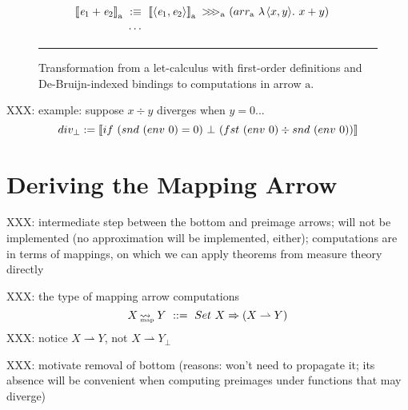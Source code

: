 \documentclass[preprint]{sigplanconf}
\newcommand{\arrow}{\rightsquigarrow}
\newcommand{\pto}{\rightharpoonup}
\newcommand{\arrowarr}{\ensuremath{arr}}
\newcommand{\arrowcomp}{\ensuremath{{>}\mspace{-6mu}{>}\mspace{-6mu}{>}}}
\newcommand{\map}{_\mathrm{map}}
\DeclareMathOperator{\mapto}{\arrow_{\mspace{-21mu}\map}}
\begin{document}
\begin{figure*}[t]
\begin{align*}
\begin{aligned}[t]
\\
	\meaningof{\mathit{e}_1 + \mathit{e}_2}\gen &\ :\equiv\
		\meaningof{\pair{\mathit{e}_1,\mathit{e}_2}}\gen~\arrowcomp\gen~(\arrowarr\gen~\fun{\pair{x,y}}{x+y})
\\
	&\ \cdots\ 
\\
\end{aligned}
\end{align*}
\hrule
\caption{Transformation from a let-calculus with first-order definitions and De-Bruijn-indexed bindings to computations in arrow $\mathrm{a}$.
}
\label{fig:semantic-function}
\end{figure*}

XXX: example: suppose $x \div y$ diverges when $y = 0$...
\begin{equation}
	div_\bot := \left\llbracket{if~(snd~(env~0) = 0)~\bot~(fst~(env~0) \div snd~(env~0))}\right\rrbracket
\end{equation}


\section{Deriving the Mapping Arrow}

XXX: intermediate step between the bottom and preimage arrows; will not be implemented (no approximation will be implemented, either); computations are in terms of mappings, on which we can apply theorems from measure theory directly

XXX: the type of mapping arrow computations
\begin{equation}
	X \mapto Y \ ::= \ Set~X \tto (X \pto Y)
\end{equation}
XXX: notice $X \pto Y$, not $X \pto Y_\bot$

XXX: motivate removal of bottom (reasons: won't need to propagate it; its absence will be convenient when computing preimages under functions that may diverge)
\end{document}
